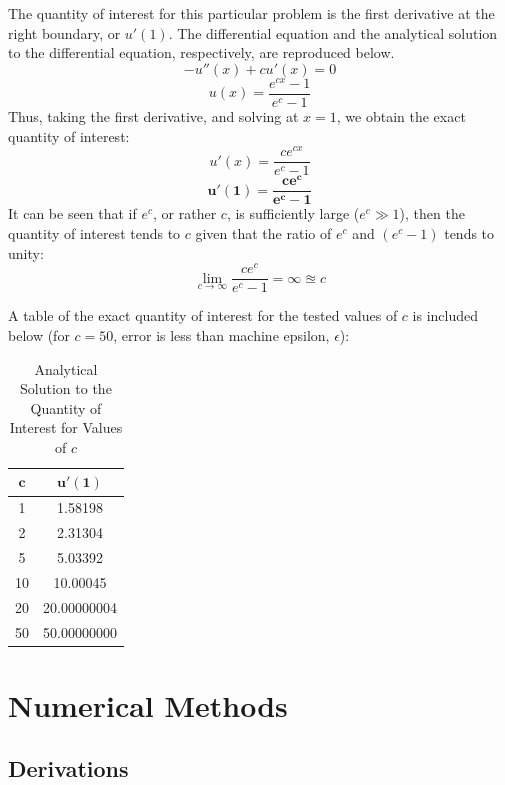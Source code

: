 \documentclass[10pt, reqno]{article}		%
\numberwithin{equation}{section}
\begin{document}
The quantity of interest for this particular problem is the first derivative at the right boundary, or $u'(1)$. The differential equation and the analytical solution to the differential equation, respectively, are reproduced below.
\begin{equation}
- u''(x)+cu'(x)=0
\end{equation}
\begin{equation}
u(x) = \frac{e^{cx}-1}{e^c-1}
\end{equation}
Thus, taking the first derivative, and solving at $x = 1$, we obtain the exact quantity of interest:
\begin{equation}
u'(x) = \frac{ce^{cx}}{e^c-1}
\end{equation}
\begin{equation}
\mathbf{u'(1) = \frac{ce^{c}}{e^c-1}}
\end{equation}
It can be seen that if $e^c$, or rather $c$, is sufficiently large ($e^c \gg 1$), then the quantity of interest tends to $c$ given that the ratio of $e^c$ and $(e^c -1)$ tends to unity:
\begin{equation}
\lim_{c\to\infty} \frac{ce^{c}}{e^c-1} = \infty \approxeq c
\end{equation}

A table of the exact quantity of interest for the tested values of $c$ is included below (for $c=50$, error is less than machine epsilon, $\epsilon$):
\begin{table}[H]
	\caption{Analytical Solution to the Quantity of Interest for Values of $c$}
\begin{tabular}{|c|c|}
	\hline 
	$\mathbf{c}$ & $\mathbf{u'(1)}$ \\ 
	\hline 
	1 & 1.58198 \\ 
	\hline 
	2 & 2.31304 \\ 
	\hline 
	5 & 5.03392 \\ 
	\hline 
	10 & 10.00045 \\ 
	\hline 
	20 & 20.00000004 \\ 
	\hline 
	50 & 50.00000000 \\ 
	\hline 
\end{tabular}
\end{table} 

\newpage

\section{Numerical Methods}

\subsection{Derivations}
\end{document}
